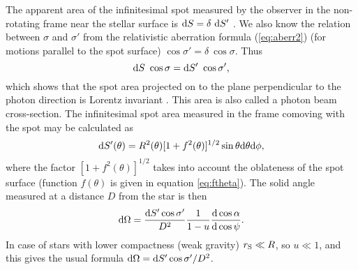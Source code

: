 \documentclass{wihuri}
\def\rg{r_{\rm S}} %
\def\be{\begin{equation}}
\def\ee{\end{equation}}
\def\d{{\rm d}}
\def\rg{r_{\rm S}} %
\def\Dop{\delta}
\begin{document}
The apparent area of the infinitesimal spot measured by the observer in the non-rotating frame near the stellar surface %
is $\d S=\Dop\ \d S'$ \cite{terrell}\cite{lightman75}.
We also know the relation between $\sigma$ and $\sigma'$ from the relativistic aberration formula (\ref{eq:aberr2}) (for motions parallel to the spot surface) $\cos\sigma' =   \Dop \ \cos\sigma$. Thus 
\be \label{eq:Salpha2}
\d S\ \cos\sigma = \d S'\ \cos\sigma', 
\ee
which shows that the spot area projected on to the plane perpendicular to the photon direction is Lorentz invariant \cite{lightman75}\cite{lindbland85}. %
This area is also called a photon beam cross-section.
The infinitesimal spot area measured in the frame comoving with the spot may be calculated as \cite{morsink} %
\be \label{eq:surf_element}
\d S'(\theta) = R^{2}(\theta) [1+f^{2}(\theta)]^{1/2} \sin \theta \d \theta \d \phi,
\ee
where the factor $[1+f^{2}(\theta)]^{1/2}$ takes into account the oblateness of the spot surface (function $f(\theta)$ is given in equation \ref{eq:ftheta}).
The solid angle measured at a distance $D$ from the star is then \cite{morsink}
\be\label{eq:omega2}
 \d\Omega=\frac{\d S' \cos \sigma'}{D^2} \frac{1}{1-u} \frac{\d\cos\alpha}{\d\cos\psi}.
\ee
In case of stars with lower compactness (weak gravity) $\rg \ll R$, so $u\ll 1$, and this gives
the usual formula $\d\Omega=\d S' \cos \sigma'/D^2$. 

\end{document}
